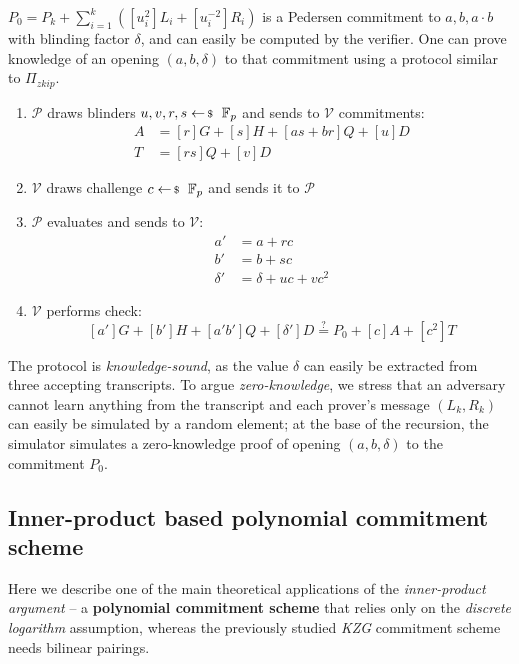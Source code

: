 \documentclass[../../book.tex]{subfiles}
\begin{document}
$P_0 = P_k + \sum_{i=1}^k ([u_i^2]L_i + [u_i^{-2}]R_i)$ is a Pedersen commitment to $a, b, a \cdot b$ with blinding factor $\delta$, and can easily be computed by the verifier. One can prove knowledge of an opening $(a,b,\delta)$ to that commitment using a protocol similar to $\Pi_{zkip}$.
\begin{enumerate}
    \item $\mathcal{P}$ draws blinders $u,v,r,s \leftarrowS \mathbb{F}_p$ and sends to $\mathcal{V}$ commitments:
    \begin{align*}
        A &= [r]G + [s]H + [as + br]Q + [u]D \\
        T &= [rs]Q + [v]D
    \end{align*}
    \item $\mathcal{V}$ draws challenge $c \leftarrowS \mathbb{F}_p$ and sends it to $\mathcal{P}$
    \item $\mathcal{P}$ evaluates and sends to $\mathcal{V}$:
    \begin{align*}
        a' &= a + rc \\
        b' &= b + sc \\
        \delta' &= \delta + uc + vc^2
    \end{align*}
    \item $\mathcal{V}$ performs check:
    $$[a']G + [b']H + [a'b']Q + [\delta']D \stackrel{\text{?}}{=} P_0 + [c]A + [c^2]T$$
\end{enumerate}

The protocol is \textit{knowledge-sound}, as the value $\delta$ can easily be extracted from three accepting transcripts. To argue \textit{zero-knowledge}, we stress that an adversary cannot learn anything from the transcript and each prover's message $(L_k, R_k)$ can easily be simulated by a random element; at the base of the recursion, the simulator simulates a zero-knowledge proof of opening $(a,b,\delta)$ to the commitment $P_0$.
\subsection{Inner-product based polynomial commitment scheme}

Here we describe one of the main theoretical applications of the \textit{inner-product argument} -- a \textbf{polynomial commitment scheme} that relies only on the \textit{discrete logarithm} assumption, whereas the previously studied \textit{KZG} commitment scheme needs bilinear pairings.
\end{document}
